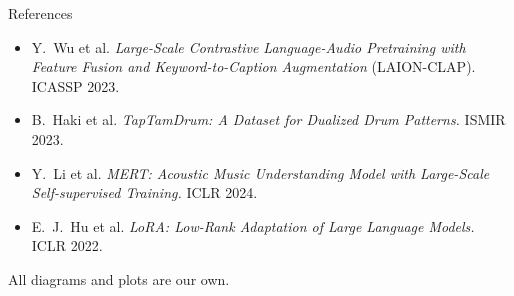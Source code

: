 \begin{frame}{References}
\begin{itemize}
    \item Y.~Wu et al. \emph{Large-Scale Contrastive Language-Audio Pretraining with Feature Fusion and Keyword-to-Caption Augmentation} (LAION-CLAP). ICASSP 2023.

    \item B.~Haki et al. \emph{TapTamDrum: A Dataset for Dualized Drum Patterns.} ISMIR 2023.
    \item Y.~Li et al. \emph{MERT: Acoustic Music Understanding Model with Large-Scale Self-supervised Training.} ICLR 2024.
    \item E.~J.~Hu et al. \emph{LoRA: Low-Rank Adaptation of Large Language Models.} ICLR 2022.
  \end{itemize}

  \vspace{0.2cm}
  {\scriptsize\color{SoftGray} All diagrams and plots are our own.\par}
\end{frame}

\appendix
